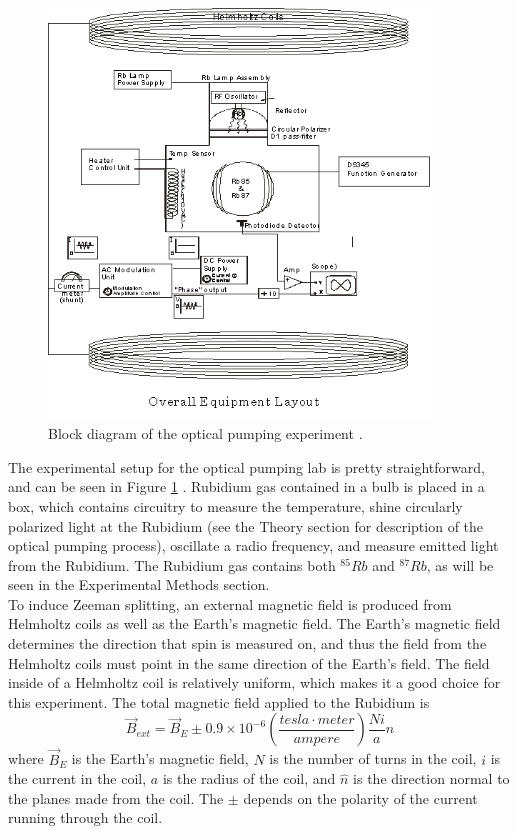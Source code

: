 \documentclass[11pt,letterpaper]{article}
\begin{document}
\begin{figure}
    \centering
    \includegraphics[width=0.9\textwidth]{figures/OPTimage001.png}
    \caption{Block diagram of the optical pumping experiment \cite{LabManual}.}
    \label{optbd}
\end{figure}

The experimental setup for the optical pumping lab is pretty straightforward,
and can be seen in Figure \ref{optbd} \cite{LabManual}. Rubidium gas contained
in a bulb is placed in a box, which contains circuitry to measure the
temperature, shine circularly polarized light at the Rubidium (see the Theory
section for description of the optical pumping process), oscillate a radio
frequency, and measure emitted light from the Rubidium. The Rubidium gas
contains both $^{85}Rb$ and $^{87}Rb$, as will be seen in the Experimental
Methods section.\\

To induce Zeeman splitting, an external magnetic field is produced from
Helmholtz coils as well as the Earth's magnetic field. The Earth's magnetic
field determines the direction that spin is measured on, and thus the field from
the Helmholtz coils must point in the same direction of the Earth's field. The
field inside of a Helmholtz coil is relatively uniform, which makes it a good
choice for this experiment. The total magnetic field applied to the Rubidium is
\cite{LabManual}
\begin{equation}
    \vec{B}_{ext} = \vec{B}_{E} \pm 0.9 \times 10^{-6} \left(\frac{tesla \cdot
    meter}{ampere} \right) \frac{Ni}{a} \hat{n}
    \label{totalbext}
\end{equation}
where $\vec{B}_E$ is the Earth's magnetic field, $N$ is the number of turns in
the coil, $i$ is the current in the coil, $a$ is the radius of the coil, and
$\hat{n}$ is the direction normal to the planes made from the coil. The $\pm$
depends on the polarity of the current running through the coil.\\
\end{document}
